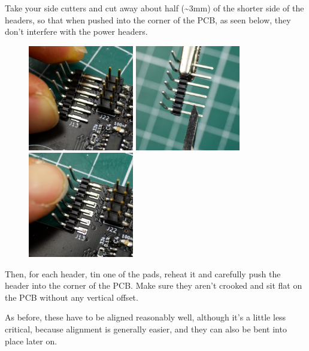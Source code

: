 \documentclass[12pt, a4paper]{article}
\begin{document}
Take your side cutters and cut away about half (\textasciitilde3mm) of the shorter side of the
headers, so that when pushed into the corner of the PCB, as seen below, they don't interfere
with the power headers.

\begin{figure}[H]
    \centering
    \includegraphics[width=46mm]{images/section_2-2_testfit.jpg}
    \hspace{2mm}
    \includegraphics[width=46mm]{images/section_2-2_cutting.jpg}
    \hspace{2mm}
    \includegraphics[width=46mm]{images/section_2-2_aligning.jpg}
\end{figure}

Then, for each header, tin one of the pads, reheat it and carefully push the header into the 
corner of the PCB. Make sure they aren't crooked and sit flat on the PCB without any vertical
offset.

As before, these have to be aligned reasonably well, although it's a little less critical,
because alignment is generally easier, and they can also be bent into place later on.
\end{document}
